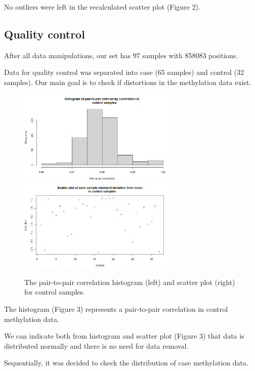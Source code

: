 \documentclass[
]{article}
\begin{document}
No outliers were left in the recalculated scatter plot (Figure 2).

\newpage

\hypertarget{quality-control}{%
\subsection{Quality control}\label{quality-control}}

After all data manipulations, our set has 97 samples with 858083
positions.

Data for quality control was separated into case (65 samples) and
control (32 samples). Our main goal is to check if distortions in the
methylation data exist.

\begin{figure}[!h]
  \begin{center}
    \includegraphics[width=75mm]{./5.png}
    \includegraphics[width=75mm]{./7.png}
    \caption{
      The pair-to-pair correlation histogram (left) and scatter plot (right) for 
      control samples.
    }
  \end{center}
\end{figure}

The histogram (Figure 3) represents a pair-to-pair correlation in
control methylation data.

We can indicate both from histogram and scatter plot (Figure 3) that
data is distributed normally and there is no need for data removal.

Sequentially, it was decided to check the distribution of case
methylation data.
\end{document}
